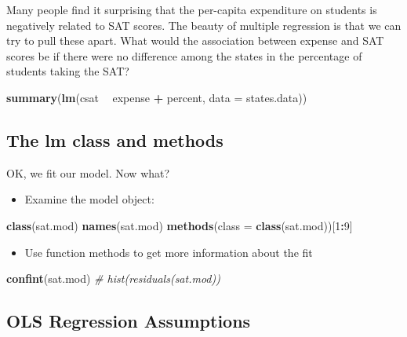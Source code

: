 \documentclass[]{book}
\newenvironment{Shaded}{\begin{snugshade}}{\end{snugshade}}
\newcommand{\KeywordTok}[1]{\textcolor[rgb]{0.13,0.29,0.53}{\textbf{#1}}}
\newcommand{\DataTypeTok}[1]{\textcolor[rgb]{0.13,0.29,0.53}{#1}}
\newcommand{\DecValTok}[1]{\textcolor[rgb]{0.00,0.00,0.81}{#1}}
\newcommand{\StringTok}[1]{\textcolor[rgb]{0.31,0.60,0.02}{#1}}
\newcommand{\CommentTok}[1]{\textcolor[rgb]{0.56,0.35,0.01}{\textit{#1}}}
\newcommand{\OperatorTok}[1]{\textcolor[rgb]{0.81,0.36,0.00}{\textbf{#1}}}
\newcommand{\NormalTok}[1]{#1}
\providecommand{\tightlist}{%
  \setlength{\itemsep}{0pt}\setlength{\parskip}{0pt}}
\begin{document}
Many people find it surprising that the per-capita expenditure on
students is negatively related to SAT scores. The beauty of multiple
regression is that we can try to pull these apart. What would the
association between expense and SAT scores be if there were no
difference among the states in the percentage of students taking the
SAT?

\begin{Shaded}
\begin{Highlighting}[]
  \KeywordTok{summary}\NormalTok{(}\KeywordTok{lm}\NormalTok{(csat }\OperatorTok{~}\StringTok{ }\NormalTok{expense }\OperatorTok{+}\StringTok{ }\NormalTok{percent, }\DataTypeTok{data =}\NormalTok{ states.data))}
\end{Highlighting}
\end{Shaded}

\subsection{The lm class and methods}\label{the-lm-class-and-methods}

OK, we fit our model. Now what?

\begin{itemize}
\tightlist
\item
  Examine the model object:
\end{itemize}

\begin{Shaded}
\begin{Highlighting}[]
  \KeywordTok{class}\NormalTok{(sat.mod)}
  \KeywordTok{names}\NormalTok{(sat.mod)}
  \KeywordTok{methods}\NormalTok{(}\DataTypeTok{class =} \KeywordTok{class}\NormalTok{(sat.mod))[}\DecValTok{1}\OperatorTok{:}\DecValTok{9}\NormalTok{]}
\end{Highlighting}
\end{Shaded}

\begin{itemize}
\tightlist
\item
  Use function methods to get more information about the fit
\end{itemize}

\begin{Shaded}
\begin{Highlighting}[]
  \KeywordTok{confint}\NormalTok{(sat.mod)}
  \CommentTok{# hist(residuals(sat.mod))}
\end{Highlighting}
\end{Shaded}

\subsection{OLS Regression
Assumptions}\label{ols-regression-assumptions}
\end{document}
